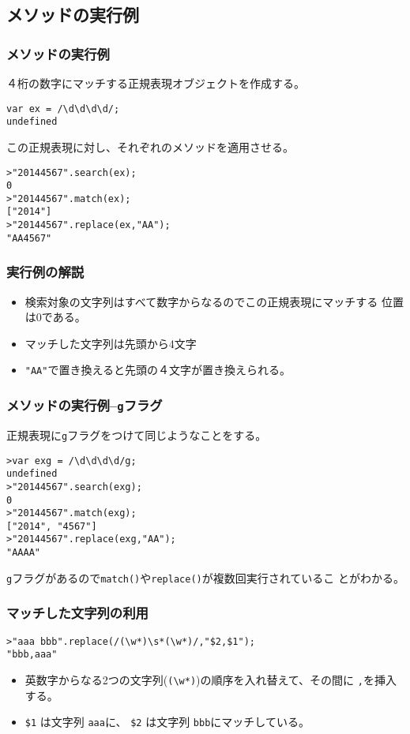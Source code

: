\subsection{メソッドの実行例}
\begin{frame}[containsverbatim]
 \frametitle{メソッドの実行例}
４桁の数字にマッチする正規表現オブジェクトを作成する。
\begin{Verbatim}
var ex = /\d\d\d\d/;
undefined
\end{Verbatim}
この正規表現に対し、それぞれのメソッドを適用させる。
\begin{Verbatim}
>"20144567".search(ex);
0
>"20144567".match(ex);
["2014"]
>"20144567".replace(ex,"AA");
"AA4567"
\end{Verbatim}
\end{frame}
\begin{frame}[containsverbatim]
 \frametitle{実行例の解説}
\begin{itemize}
 \item 検索対象の文字列はすべて数字からなるのでこの正規表現にマッチする
       位置は$0$である。
 \item マッチした文字列は先頭から4文字
 \item \Verb+"AA"+で置き換えると先頭の４文字が置き換えられる。
\end{itemize}
\end{frame}
\begin{frame}[containsverbatim]
 \frametitle{メソッドの実行例--\protect\texttt{g}フラグ}
正規表現に\Verb+g+フラグをつけて同じようなことをする。
\begin{Verbatim}
>var exg = /\d\d\d\d/g;
undefined
>"20144567".search(exg);
0
>"20144567".match(exg);
["2014", "4567"]
>"20144567".replace(exg,"AA");
"AAAA"
\end{Verbatim}
\Verb+g+フラグがあるので\Verb+match()+や\Verb+replace()+が複数回実行されているこ
 とがわかる。
\end{frame}
\begin{frame}[containsverbatim]
 \frametitle{マッチした文字列の利用}
\begin{Verbatim}
>"aaa bbb".replace(/(\w*)\s*(\w*)/,"$2,$1");
"bbb,aaa"
\end{Verbatim}
\begin{itemize}
 \item 英数字からなる2つの文字列(\Verb+(\w*)+)の順序を入れ替えて、その間に
 \Verb+,+を挿入する。
 \item \Verb+$1+ は文字列 \Verb+aaa+に、
\Verb+$2+ は文字列 \Verb+bbb+にマッチしている。
\end{itemize}
\end{frame}
